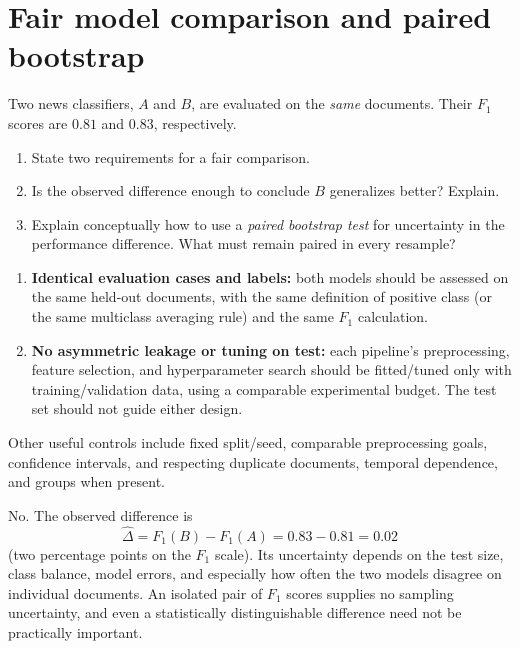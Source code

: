 \section{Fair model comparison and paired bootstrap}
\label{sec:ex16}
\begin{problem}
Two news classifiers, $A$ and $B$, are evaluated on the \emph{same} documents. Their $F_1$ scores are $0.81$ and $0.83$, respectively.
\begin{enumerate}[label=\textbf{(\alph*)}]
\item State two requirements for a fair comparison.
\item Is the observed difference enough to conclude $B$ generalizes better? Explain.
\item Explain conceptually how to use a \emph{paired bootstrap test} for uncertainty in the performance difference. What must remain paired in every resample?
\end{enumerate}
\end{problem}


\begin{enumerate}
\item \textbf{Identical evaluation cases and labels:} both models should be assessed on the same held-out documents, with the same definition of positive class (or the same multiclass averaging rule) and the same $F_1$ calculation.
\item \textbf{No asymmetric leakage or tuning on test:} each pipeline's preprocessing, feature selection, and hyperparameter search should be fitted/tuned only with training/validation data, using a comparable experimental budget. The test set should not guide either design.
\end{enumerate}
Other useful controls include fixed split/seed, comparable preprocessing goals, confidence intervals, and respecting duplicate documents, temporal dependence, and groups when present.

No. The observed difference is
\[
\hat\Delta=F_1(B)-F_1(A)=0.83-0.81=\boxed{0.02}
\]
(two percentage points on the $F_1$ scale). Its uncertainty depends on the test size, class balance, model errors, and especially how often the two models disagree on individual documents. An isolated pair of $F_1$ scores supplies no sampling uncertainty, and even a statistically distinguishable difference need not be practically important.

